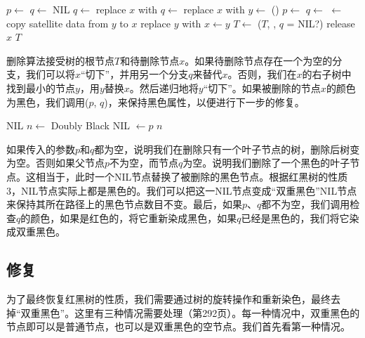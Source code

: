\documentclass{ctexart}
\begin{document}
\begin{algorithmic}[1]
  \State $p \gets$ 
  \State $q \gets$ NIL
    \State $q \gets$ 
    \State replace $x$ with 
    \State $q \gets$ 
    \State replace $x$ with 
  \Else
    \State $y \gets$ ()
    \State $p \gets$ 
    \State $q \gets$ 
    \State {} $\gets$ 
    \State copy satellite data from $y$ to $x$
    \State replace $y$ with 
    \State $x \gets y$
  \EndIf
    \State $T \gets$ ($T$, , $q$ = NIL?)
  \EndIf
  \State release $x$
  \State \Return $T$
\EndFunction
\end{algorithmic}

删除算法接受树的根节点$T$和待删除节点$x$。如果待删除节点存在一个为空的分支，我们可以将$x$“切下”，并用另一个分支$q$来替代$x$。否则，我们在$x$的右子树中找到最小的节点$y$，用$y$替换$x$。然后递归地将$y$“切下”。如果被删除的节点$x$的颜色为黑色，我们调用($p$, $q$)，来保持黑色属性，以便进行下一步的修复。

\begin{algorithmic}[1]
    \State \Return NIL 
    \State $n \gets$ Doubly Black NIL
    \State {} $\gets p$
    \State \Return $n$
  \Else
    \State \Return {}
  \EndIf
\EndFunction
\end{algorithmic}

如果传入的参数$p$和$q$都为空，说明我们在删除只有一个叶子节点的树，删除后树变为空。否则如果父节点$p$不为空，而节点$q$为空。说明我们删除了一个黑色的叶子节点。这相当于，此时一个NIL节点替换了被删除的黑色节点。根据红黑树的性质3，NIL节点实际上都是黑色的。我们可以把这一NIL节点变成“双重黑色”NIL节点来保持其所在路径上的黑色节点数目不变。最后，如果$p$、$q$都不为空，我们调用检查$q$的颜色，如果是红色的，将它重新染成黑色，如果$q$已经是黑色的，我们将它染成双重黑色。

\subsection{修复}

为了最终恢复红黑树的性质，我们需要通过树的旋转操作和重新染色，最终去掉“双重黑色”。这里有三种情况需要处理（\cite{CLRS}第292页）。每一种情况中，双重黑色的节点即可以是普通节点，也可以是双重黑色的空节点。我们首先看第一种情况。
\end{document}
